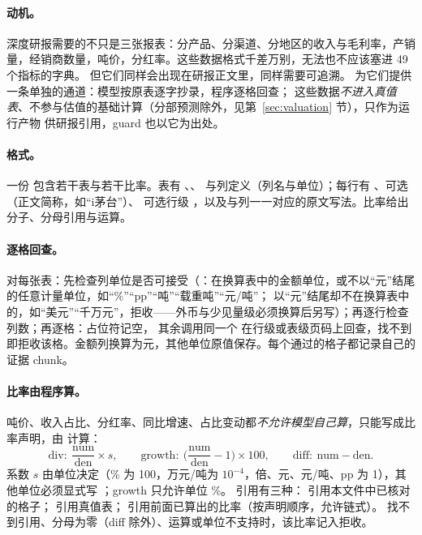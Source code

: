 \paragraph{动机。}
深度研报需要的不只是三张报表：分产品、分渠道、分地区的收入与毛利率，产销量，经销商数量，吨价，分红率。这些数据格式千差万别，无法也不应该塞进 49 个指标的字典。
但它们同样会出现在研报正文里，同样需要可追溯。 为它们提供一条单独的通道：模型按原表逐字抄录，程序逐格回查；
这些数据\emph{不进入真值表}、不参与估值的基础计算（分部预测除外，见第~\ref{sec:valuation} 节），只作为运行产物  供研报引用，guard 也以它为出处。

\paragraph{格式。}
一份  包含若干表与若干比率。表有 、、 与列定义（列名与单位）；每行有 、可选 （正文简称，如“i茅台”）、
可选行级 ，以及与列一一对应的原文写法。比率给出分子、分母引用与运算。

\paragraph{逐格回查。}
 对每张表：先检查列单位是否可接受（：在换算表中的金额单位，或不以“元”结尾的任意计量单位，如“\%”“pp”“吨”“载重吨”“元/吨”；
以“元”结尾却不在换算表中的，如“美元”“千万元”，拒收——外币与少见量级必须换算后另写）；再逐行检查列数；再逐格：占位符记空，
其余调用同一个  在行级或表级页码上回查，找不到即拒收该格。金额列换算为元，其他单位原值保存。每个通过的格子都记录自己的证据 chunk。

\paragraph{比率由程序算。}
吨价、收入占比、分红率、同比增速、占比变动都\emph{不允许模型自己算}，只能写成比率声明，由  计算：
\[
\text{div}:\ \frac{\text{num}}{\text{den}}\times s,\qquad
\text{growth}:\ \Big(\frac{\text{num}}{\text{den}}-1\Big)\times100,\qquad
\text{diff}:\ \text{num}-\text{den}.
\]
系数 $s$ 由单位决定（\% 为 100，万元/吨为 $10^{-4}$，倍、元、元/吨、pp 为 1），其他单位必须显式写 ；growth 只允许单位 \%。
引用有三种：\code{[表 id, 行名, 列名]} 引用本文件中已核对的格子；\code{["truth", 指标, 期间]} 引用真值表；\code{["ratio", 比率 id]} 引用前面已算出的比率（按声明顺序，允许链式）。
找不到引用、分母为零（diff 除外）、运算或单位不支持时，该比率记入拒收。

